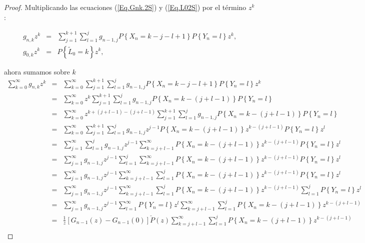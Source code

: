 \documentclass{article}
\begin{document}
\begin{proof}

Multiplicando las ecuaciones (\ref{Eq.Gnk.2S}) y (\ref{Eq.L02S})
por el t\'ermino $z^{k}$:

\begin{eqnarray*}
g_{n,k}z^{k}&=&\sum_{j=1}^{k+1}\sum_{l=1}^{j}g_{n-1,j}P\left\{X_{n}=k-j-l+1\right\}P\left\{Y_{n}=l\right\}z^{k},\\
g_{0,k}z^{k}&=&P\left\{\tilde{L}_{0}=k\right\}z^{k},
\end{eqnarray*}

ahora sumamos sobre $k$
\begin{eqnarray*}
\sum_{k=0}^{\infty}g_{n,k}z^{k}&=&\sum_{k=0}^{\infty}\sum_{j=1}^{k+1}\sum_{l=1}^{j}g_{n-1,j}P\left\{X_{n}=k-j-l+1\right\}P\left\{Y_{n}=l\right\}z^{k}\\
&=&\sum_{k=0}^{\infty}z^{k}\sum_{j=1}^{k+1}\sum_{l=1}^{j}g_{n-1,j}P\left\{X_{n}=k-\left(j+l-1\right)\right\}P\left\{Y_{n}=l\right\}\\
&=&\sum_{k=0}^{\infty}z^{k+\left(j+l-1\right)-\left(j+l-1\right)}\sum_{j=1}^{k+1}\sum_{l=1}^{j}g_{n-1,j}P\left\{X_{n}=k-\left(j+l-1\right)\right\}P\left\{Y_{n}=l\right\}\\
&=&\sum_{k=0}^{\infty}\sum_{j=1}^{k+1}\sum_{l=1}^{j}g_{n-1,j}z^{j-1}P\left\{X_{n}=k-\left(j+l-1\right)\right\}z^{k-\left(j+l-1\right)}P\left\{Y_{n}=l\right\}z^{l}\\
&=&\sum_{j=1}^{\infty}\sum_{l=1}^{j}g_{n-1,j}z^{j-1}\sum_{k=j+l-1}^{\infty}P\left\{X_{n}=k-\left(j+l-1\right)\right\}z^{k-\left(j+l-1\right)}P\left\{Y_{n}=l\right\}z^{l}\\
&=&\sum_{j=1}^{\infty}g_{n-1,j}z^{j-1}\sum_{l=1}^{j}\sum_{k=j+l-1}^{\infty}P\left\{X_{n}=k-\left(j+l-1\right)\right\}z^{k-\left(j+l-1\right)}P\left\{Y_{n}=l\right\}z^{l}\\
&=&\sum_{j=1}^{\infty}g_{n-1,j}z^{j-1}\sum_{k=j+l-1}^{\infty}\sum_{l=1}^{j}P\left\{X_{n}=k-\left(j+l-1\right)\right\}z^{k-\left(j+l-1\right)}P\left\{Y_{n}=l\right\}z^{l}\\
&=&\sum_{j=1}^{\infty}g_{n-1,j}z^{j-1}\sum_{k=j+l-1}^{\infty}\sum_{l=1}^{j}P\left\{X_{n}=k-\left(j+l-1\right)\right\}z^{k-\left(j+l-1\right)}\sum_{l=1}^{j}P\left\{Y_{n}=l\right\}z^{l}\\
&=&\sum_{j=1}^{\infty}g_{n-1,j}z^{j-1}\sum_{l=1}^{\infty}P\left\{Y_{n}=l\right\}z^{l}\sum_{k=j+l-1}^{\infty}\sum_{l=1}^{j}P\left\{X_{n}=k-\left(j+l-1\right)\right\}z^{k-\left(j+l-1\right)}\\
&=&\frac{1}{z}\left[G_{n-1}\left(z\right)-G_{n-1}\left(0\right)\right]\check{P}\left(z\right)\sum_{k=j+l-1}^{\infty}\sum_{l=1}^{j}P\left\{X_{n}=k-\left(j+l-1\right)\right\}z^{k-\left(j+l-1\right)}\\

\end{eqnarray*}
\end{proof}
\end{document}
